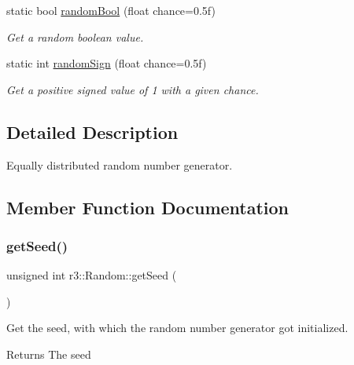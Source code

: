 \begin{DoxyCompactItemize}
static bool \mbox{\hyperlink{classr3_1_1_random_a63733fee2f7cf42bab7ad00b1a23a0d1}{random\+Bool}} (float chance=0.\+5f)
\begin{DoxyCompactList}\small\item\em Get a random boolean value. \end{DoxyCompactList}\item 
static int \mbox{\hyperlink{classr3_1_1_random_a27bd8d68f82223df0421bc309e83647f}{random\+Sign}} (float chance=0.\+5f)
\begin{DoxyCompactList}\small\item\em Get a positive signed value of 1 with a given chance. \end{DoxyCompactList}\end{DoxyCompactItemize}


\subsection{Detailed Description}
Equally distributed random number generator. 

\subsection{Member Function Documentation}
\mbox{\label{classr3_1_1_random_a5d1f4fef27e14bde1e3b560728b7d3ba}} 
\subsubsection{\texorpdfstring{get\+Seed()}{getSeed()}}
{\footnotesize\ttfamily unsigned int r3\+::\+Random\+::get\+Seed (\begin{DoxyParamCaption}{ }\end{DoxyParamCaption})\hspace{0.3cm}{\ttfamily [static]}}



Get the seed, with which the random number generator got initialized. 

\begin{DoxyReturn}{Returns}
The seed 
\end{DoxyReturn}
\mbox{\label{classr3_1_1_random_a63733fee2f7cf42bab7ad00b1a23a0d1}} 
